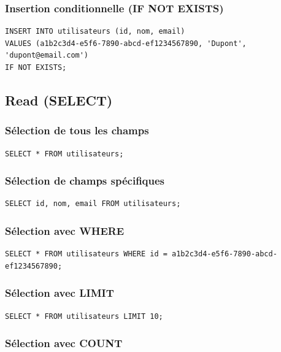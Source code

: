 \documentclass[11pt,a4paper]{article}
\begin{document}
\subsubsection{Insertion conditionnelle (IF NOT EXISTS)}

\begin{lstlisting}
INSERT INTO utilisateurs (id, nom, email)
VALUES (a1b2c3d4-e5f6-7890-abcd-ef1234567890, 'Dupont', 'dupont@email.com')
IF NOT EXISTS;
\end{lstlisting}

\subsection{Read (SELECT)}

\subsubsection{Sélection de tous les champs}

\begin{lstlisting}
SELECT * FROM utilisateurs;
\end{lstlisting}

\subsubsection{Sélection de champs spécifiques}

\begin{lstlisting}
SELECT id, nom, email FROM utilisateurs;
\end{lstlisting}

\subsubsection{Sélection avec WHERE}

\begin{lstlisting}
SELECT * FROM utilisateurs WHERE id = a1b2c3d4-e5f6-7890-abcd-ef1234567890;
\end{lstlisting}

\subsubsection{Sélection avec LIMIT}

\begin{lstlisting}
SELECT * FROM utilisateurs LIMIT 10;
\end{lstlisting}

\subsubsection{Sélection avec COUNT}
\end{document}
